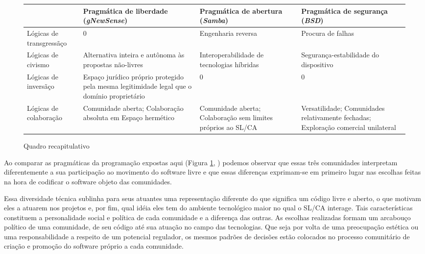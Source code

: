 \begin{figure}[hbt]
\caption{Quadro recapitulativo} \label{fig3.1}
\begin{tabular}{|L{3cm}|L{3.5cm}|L{3.5cm}|L{3.5cm}|}
\hline
 & Pragm\'atica de liberdade (\emph{gNewSense}) & Pragm\'atica de abertura (\emph{Samba}) & Pragm\'atica de seguran\c ca (\emph{BSD}) \\
\hline
L\'ogicas de transgress\~a\c co & 0 & Engenharia reversa & Procura de falhas \\
\hline
L\'ogicas de civismo & Alternativa inteira e aut\^onoma \`as propostas n\~ao-livres & Interoperabilidade de tecnologias h\'i­bridas & Seguran\c ca-estabilidade do dispositivo \\
\hline
L\'ogicas de invers\~a\c co & Espa\c co jur\'idico pr\'oprio protegido pela mesma legitimidade legal que o dom\'i­nio propriet\'ario & 0 & 0 \\
\hline
L\'ogicas de colabora\c c\~ao & Comunidade aberta; Colabora\c c\~ao absoluta em Espa\c co herm\'etico & Comunidade aberta; Colabora\c c\~ao sem limites pr\'oprios ao SL/CA & Versatilidade; Comunidades relativamente fechadas; Explora\c c\~ao comercial unilateral \\
\hline
\end{tabular}
\end{figure}


Ao comparar as pragmáticas da programação expostas aqui (Figura \ref{fig3.1}, \pageref{fig3.1}) podemos observar que essas três comunidades interpretam diferentemente a sua participação ao movimento do software livre e que essas diferenças exprimam-se em primeiro lugar nas escolhas feitas na hora de codificar o software objeto das comunidades.

Essa diversidade técnica sublinha para seus atuantes uma representação diferente do que significa um código livre e aberto, o que motivam eles a atuarem nos projetos e, por fim, qual idéia eles tem do ambiente tecnológico maior no qual o SL/CA interage. Tais características constituem a personalidade social e política de cada comunidade e a diferença das outras. As escolhas realizadas formam um arcabouço político de uma comunidade, de seu código até sua atuação no campo das tecnologias. Que seja por volta de uma preocupação estética ou uma responsabilidade a respeito de um potencial regulador, os mesmos padrões de decisões estão colocados no processo comunitário de criação e promoção do software próprio a cada comunidade.

